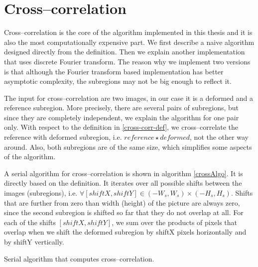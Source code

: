 \section{Cross--correlation}
Cross--correlation is the core of the algorithm implemented in this thesis and it is also the most computationally expensive part. We first describe a naive algorithm designed directly from the definition. Then we explain another implementation that uses discrete Fourier transform. The reason why we implement two versions is that although the Fourier transform based implementation has better asymptotic complexity, the subregions may not be big enough to reflect it.

The input for cross--correlation are two images, in our case it is a deformed and a reference subregion. More precisely, there are several pairs of subregions, but since they are completely independent, we explain the algorithm for one pair only. With respect to the definition in \cref{cross-corr-def}, we cross--correlate the reference with deformed subregion, i.e. $reference \star deformed$, not the other way around. Also, both subregions are of the same size, which simplifies some aspects of the algorithm.

A serial algorithm for cross--correlation is shown in algorithm \ref{crossAlgo}. It is directly based on the definition. It iterates over all possible shifts between the images (subregions), i.e. $\forall [shiftX, shiftY] \in (-W_s, W_s) \times (-H_s, H_s)$. Shifts that are further from zero than width (height) of the picture are always zero, since the second subregion is shifted so far that they do not overlap at all. For each of the shifts $[shiftX, shiftY]$, we sum over the products of pixels that overlap when we shift the deformed subregion by shiftX pixels horizontally and by shiftY vertically.



\begin{algorithm}
	\caption{Serial algorithm that computes cross--correlation.}
	\label{crossAlgo}
	\vspace{5px}
	
	\For{$\text{shiftX} \in (-W_s, W_s)$}{
		\For{$\text{shiftY} \in (-H_s, H_s)$}{
			sum = 0\;
			\For{$x \in [0, W_s)$}{
				\For{$y \in [0, H_s)$}{
					shiftedX = x + shiftX\;
					shiftedY = y + shiftY\;
					\If{$\text{shiftedX} \in [0,W_s]$ \textbf{and} $\text{shiftedY} \in [0,H_s]$}{
						sum += reference[x,y] * \newline deformed[shiftedX, shiftedY]\;
					}
				}
			}
			result[shiftX, shiftY] = sum\;
		}
	}
\end{algorithm}

